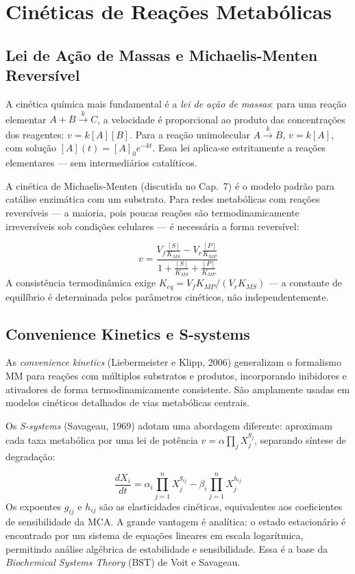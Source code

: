 \section{Cinéticas de Reações Metabólicas}

\subsection{Lei de Ação de Massas e Michaelis-Menten Reversível}

A cinética química mais fundamental é a \emph{lei de ação de massas}: para uma reação
elementar $A + B \xrightarrow{k} C$, a velocidade é proporcional ao produto das
concentrações dos reagentes: $v = k[A][B]$. Para a reação unimolecular $A \xrightarrow{k}
B$, $v = k[A]$, com solução $[A](t) = [A]_0 e^{-kt}$. Essa lei aplica-se estritamente a
reações elementares --- sem intermediários catalíticos.

A cinética de Michaelis-Menten (discutida no Cap.\ 7) é o modelo padrão para catálise
enzimática com um substrato. Para redes metabólicas com reações reversíveis --- a maioria,
pois poucas reações são termodinamicamente irreversíveis sob condições celulares --- é
necessária a forma reversível:

\begin{equation}
v = \frac{V_f \frac{[S]}{K_{MS}} - V_r \frac{[P]}{K_{MP}}}{1 + \frac{[S]}{K_{MS}} + \frac{[P]}{K_{MP}}}
\end{equation}
A consistência termodinâmica exige $K_{eq} = V_f K_{MP} / (V_r K_{MS})$ --- a constante
de equilíbrio é determinada pelos parâmetros cinéticos, não independentemente.

\subsection{Convenience Kinetics e S-systems}

As \emph{convenience kinetics} (Liebermeister e Klipp, 2006) generalizam o formalismo MM
para reações com múltiplos substratos e produtos, incorporando inibidores e ativadores
de forma termodinamicamente consistente. São amplamente usadas em modelos cinéticos
detalhados de vias metabólicas centrais.

Os \emph{S-systems} (Savageau, 1969) adotam uma abordagem diferente: aproximam cada taxa
metabólica por uma lei de potência $v = \alpha \prod_j X_j^{g_j}$, separando síntese de
degradação:

\begin{equation}
\frac{dX_i}{dt} = \alpha_i \prod_{j=1}^{n} X_j^{g_{ij}} - \beta_i \prod_{j=1}^{n} X_j^{h_{ij}}
\end{equation}
Os expoentes $g_{ij}$ e $h_{ij}$ são as elasticidades cinéticas, equivalentes aos
coeficientes de sensibilidade da MCA. A grande vantagem é analítica: o estado estacionário
é encontrado por um sistema de equações lineares em escala logarítmica, permitindo análise
algébrica de estabilidade e sensibilidade. Essa é a base da \emph{Biochemical Systems
Theory} (BST) de Voit e Savageau.


